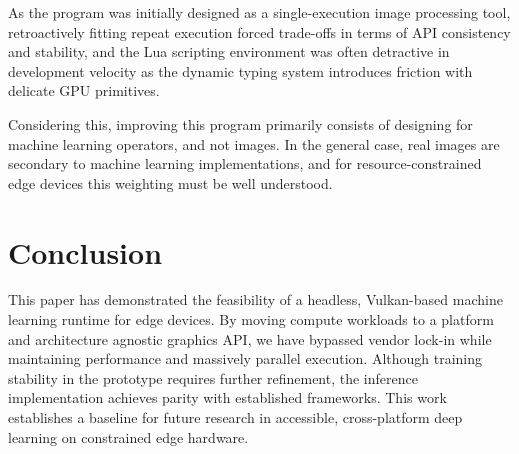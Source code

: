 \documentclass[10pt, a4paper]{article}
\begin{document}
As the program was initially designed as a single-execution image processing tool, retroactively fitting repeat execution forced trade-offs in terms of API consistency and stability, and the Lua scripting environment was often detractive in development velocity as the dynamic typing system introduces friction with delicate GPU primitives.

Considering this, improving this program primarily consists of designing for machine learning operators, and not images. In the general case, real images are secondary to machine learning implementations, and for resource-constrained edge devices this weighting must be well understood. 

\section{Conclusion}
This paper has demonstrated the feasibility of a headless, Vulkan-based machine learning runtime for edge devices. By moving compute workloads to a platform and architecture agnostic graphics API, we have bypassed vendor lock-in while maintaining performance and massively parallel execution. Although training stability in the prototype requires further refinement, the inference implementation achieves parity with established frameworks. This work establishes a baseline for future research in accessible, cross-platform deep learning on constrained edge hardware.



\end{document}
